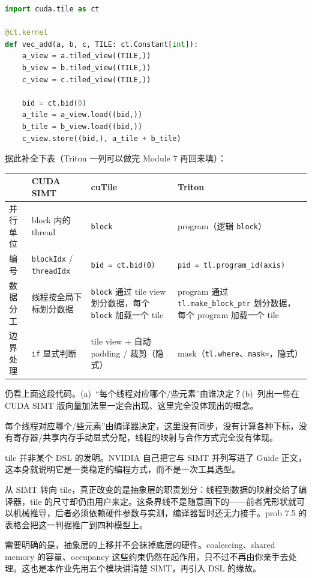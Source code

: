 \documentclass[11pt,a4paper,fontset=none]{ctexart}
\begin{document}
\begin{lstlisting}[language=Python]
import cuda.tile as ct

@ct.kernel
def vec_add(a, b, c, TILE: ct.Constant[int]):
    a_view = a.tiled_view((TILE,))
    b_view = b.tiled_view((TILE,))
    c_view = c.tiled_view((TILE,))

    bid = ct.bid(0)
    a_tile = a_view.load((bid,))
    b_tile = b_view.load((bid,))
    c_view.store((bid,), a_tile + b_tile)
\end{lstlisting}

据此补全下表（Triton 一列可以做完 Module 7 再回来填）：

\begin{center}\small
\begin{tabular}{@{}l p{7.8em} p{9.2em} p{9.2em} @{}}
\toprule
 & CUDA SIMT & cuTile & Triton \\
\midrule
并行单位
  & block 内的 thread
  & \texttt{block}
  & program（逻辑 \texttt{block}） \\
\addlinespace[2pt]
编号
  & \texttt{blockIdx} / \texttt{threadIdx}
  & \texttt{bid = ct.bid(0)}
  & \texttt{pid = tl.program\_id(axis)} \\
\addlinespace[2pt]
数据分工
  & 线程按全局下标划分数据
  & \texttt{block} 通过 tile view 划分数据，每个 \texttt{block} 加载一个 tile
  & program 通过 \texttt{tl.make\_block\_ptr} 划分数据，每个 program 加载一个 tile \\
\addlinespace[2pt]
边界处理
  & \texttt{if} 显式判断
  & tile view + 自动 padding / 裁剪（隐式）
  & mask（\texttt{tl.where}、\texttt{mask=}，隐式） \\
\bottomrule
\end{tabular}
\end{center}

仍看上面这段代码。(a)~“每个线程对应哪个/些元素”由谁决定？(b)~列出一些在 CUDA SIMT 版向量加法里一定会出现、这里完全没体现出的概念。

每个线程对应哪个/些元素”由编译器决定，这里没有同步，没有计算各种下标，没有寄存器/共享内存手动显式分配，线程的映射与合作方式完全没有体现。

\begin{lookback}
tile 并非某个 DSL 的发明。NVIDIA 自己把它与 SIMT 并列写进了 Guide 正文，这本身就说明它是一类稳定的编程方式，而不是一次工具选型。

从 SIMT 转向 tile，真正改变的是抽象层的职责划分：线程到数据的映射交给了编译器，tile 的尺寸却仍由用户来定。这条界线不是随意画下的——前者凭形状就可以机械推导，后者必须依赖硬件参数与实测，编译器暂时还无力接手。prob 7.5 的表格会把这一判据推广到四种模型上。

需要明确的是，抽象层的上移并不会抹掉底层的硬件。coalescing、shared memory 的容量、occupancy 这些约束仍然在起作用，只不过不再由你亲手去处理。这也是本作业先用五个模块讲清楚 SIMT，再引入 DSL 的缘故。
\end{lookback}
\end{document}

